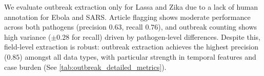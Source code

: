 We evaluate outbreak extraction only for Lassa and Zika due to a lack of human annotation for Ebola and SARS. Article flagging shows moderate performance across both pathogens (precision $0.63$, recall $0.76$), and outbreak counting shows high variance ($\pm 0.28$ for recall) driven by pathogen-level differences. Despite this, field-level extraction is robust: outbreak extraction achieves the highest precision ($0.85$) amongst all data types, with particular strength in temporal features and case burden (See \cref{tab:outbreak_detailed_metrics}).



